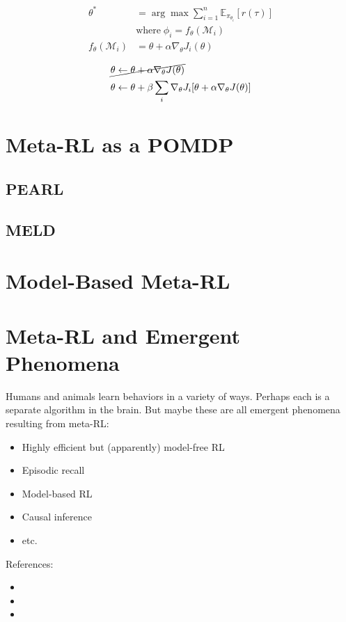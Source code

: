 \begin{align}
	\theta^* &= \arg\max \sum_{i=1}^n \mathbb{E}_{\pi_{\theta_i}} [r(\tau)]\\
	&\text{where}\; \phi_i = f_\theta(\mathcal{M}_i)\\
	f_\theta(\mathcal{M}_i) &= \theta + \alpha \nabla_\theta J_i(\theta)
\end{align}

\begin{align}
	&\cancel{\theta \leftarrow \theta + \alpha \nabla_\theta J(\theta)}\\
	&\theta \leftarrow \theta + \beta \sum_i \nabla_\theta J_i[\theta + \alpha \nabla_\theta J(\theta)]
\end{align}

\section{Meta-RL as a POMDP}
\subsection{PEARL}
\subsection{MELD}

\section{Model-Based Meta-RL}

\section{Meta-RL and Emergent Phenomena}
Humans and animals learn behaviors in a variety of ways. Perhaps each is a separate algorithm in the brain. But maybe these are all emergent phenomena resulting from meta-\ac{RL}:
\begin{itemize}
	\item Highly efficient but (apparently) model-free RL
	\item Episodic recall
	\item Model-based RL
	\item Causal inference
	\item etc.
\end{itemize}

References:
\begin{itemize}
	\item {}
	\item {}
	\item {}
\end{itemize}

